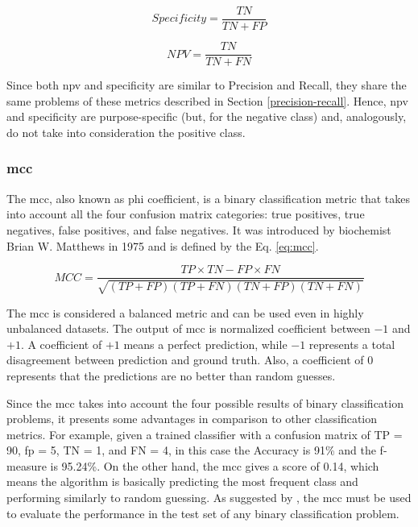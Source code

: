\begin{equation}
\label{eq:specificity}
Specificity = \frac{TN}{TN + FP}
\end{equation}

\begin{equation}
\label{eq:npv}
NPV = \frac{TN}{TN + FN}
\end{equation}

Since both \acs{npv} and specificity are similar to Precision and Recall, they share the same problems of these metrics described in Section \ref{precision-recall}. Hence, \acs{npv} and specificity are purpose-specific (but, for the negative class) and, analogously, do not take into consideration the positive class.

\subsubsection{\acl{mcc}} \label{sec:mcc}

The \acf{mcc}, also known as phi coefficient, is a binary classification metric that takes into account all the four confusion matrix categories: true positives, true negatives, false positives, and false negatives. It was introduced by biochemist Brian W. Matthews in 1975 \citep{matthews1975comparison} and is defined by the Eq. \ref{eq:mcc}.

\begin{equation}
\label{eq:mcc}
MCC = \frac{TP \times TN - FP \times FN}{\sqrt{(TP + FP)(TP + FN)(TN + FP)(TN + FN)}}
\end{equation}

The \acs{mcc} is considered a balanced metric and can be used even in highly unbalanced datasets. The output of \acs{mcc} is normalized coefficient between $-1$ and $+1$. A coefficient of $+1$ means a perfect prediction, while $-1$ represents a total disagreement between prediction and ground truth. Also, a coefficient of $0$ represents that the predictions are no better than random guesses. 

Since the \acs{mcc} takes into account the four possible results of binary classification problems, it presents some advantages in comparison to other classification metrics. For example, given a trained classifier with a confusion matrix of TP = 90, \acs{fp} = 5, TN = 1, and FN = 4, in this case the Accuracy is 91\% and the f-measure is 95.24\%. On the other hand, the \acs{mcc} gives a score of 0.14, which means the algorithm is basically predicting the most frequent class and performing similarly to random guessing. As suggested by \cite{chicco2017ten}, the \acs{mcc} must be used to evaluate the performance in the test set of any binary classification problem.

